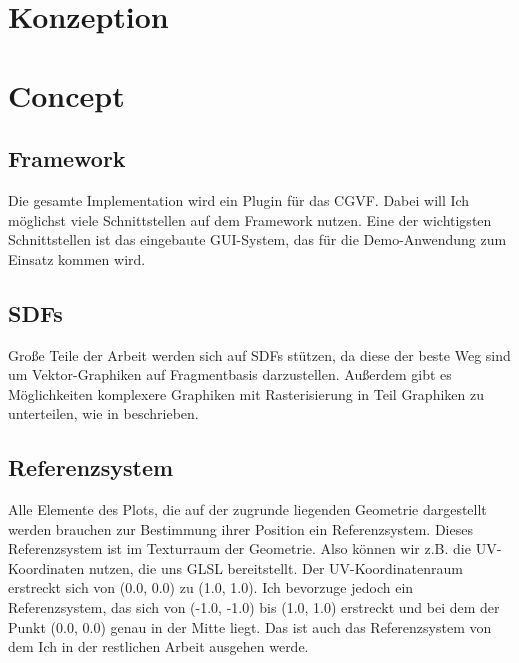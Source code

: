 {\chapter{Konzeption}}
{\chapter{Concept}}
\label{sec:concept}

\section{Framework}
Die gesamte Implementation wird ein Plugin für das CGVF.
Dabei will Ich möglichst viele Schnittstellen auf dem Framework nutzen.
Eine der wichtigsten Schnittstellen ist das eingebaute GUI-System, das für die Demo-Anwendung zum Einsatz kommen wird.

\section{SDFs}
Große Teile der Arbeit werden sich auf SDFs stützen, da diese der beste Weg sind um Vektor-Graphiken auf Fragmentbasis darzustellen.
Außerdem gibt es Möglichkeiten komplexere Graphiken mit Rasterisierung in Teil Graphiken zu unterteilen, wie in \cite{Nehab2008} beschrieben.


\section{Referenzsystem}
Alle Elemente des Plots, die auf der zugrunde liegenden Geometrie dargestellt werden brauchen zur Bestimmung ihrer Position ein Referenzsystem.
Dieses Referenzsystem ist im Texturraum der Geometrie.
Also können wir z.B. die UV-Koordinaten nutzen, die uns GLSL bereitstellt.
Der UV-Koordinatenraum erstreckt sich von (0.0, 0.0) zu (1.0, 1.0).
Ich bevorzuge jedoch ein Referenzsystem, das sich von (-1.0, -1.0) bis (1.0, 1.0) erstreckt und bei dem der Punkt (0.0, 0.0) genau in der Mitte liegt.
Das ist auch das Referenzsystem von dem Ich in der restlichen Arbeit ausgehen werde.

